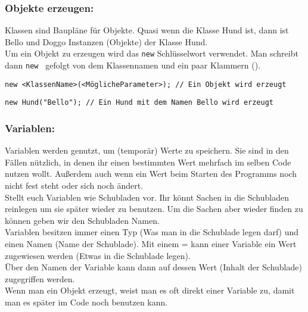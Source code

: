 \begin{Infobox}

	\subsubsection*{Objekte erzeugen:}
	Klassen sind Baupläne für Objekte. Quasi wenn die Klasse Hund ist, dann ist Bello und Doggo Instanzen (Objekte) der Klasse Hund.\\
	Um ein Objekt zu erzeugen wird das \lstinline{new} Schlüsselwort verwendet.
	Man schreibt dann \lstinline{new } gefolgt von dem Klassennamen und ein paar Klammern ().
\end{Infobox}
\begin{lstlisting}[title=\textbf{Objekt erstellen Syntax}]
	new <KlassenName>(<MöglicheParameter>); // Ein Objekt wird erzeugt
\end{lstlisting}

\begin{lstlisting}[title=\textbf{Objekt erstellen Beispiel}]
	new Hund("Bello"); // Ein Hund mit dem Namen Bello wird erzeugt
\end{lstlisting}
\begin{Infobox}
	\subsubsection*{Variablen:}
	Variablen werden genutzt, um (temporär) Werte zu speichern.
	Sie sind in den Fällen nützlich, in denen ihr einen bestimmten Wert mehrfach im selben Code nutzen wollt.
	Außerdem auch wenn ein Wert beim Starten des Programms noch nicht fest steht oder sich noch ändert.\\

	Stellt euch Variablen wie Schubladen vor. Ihr könnt Sachen in die Schubladen reinlegen um sie später wieder zu benutzen. Um die Sachen aber wieder finden zu können geben wir den Schubladen Namen.\\

	Variablen besitzen immer einen Typ (Was man in die Schublade legen darf) und einen Namen (Name der Schublade).
	Mit einem = kann einer Variable ein Wert zugewiesen werden (Etwas in die Schublade legen).\\
	Über den Namen der Variable kann dann auf dessen Wert (Inhalt der Schublade) zugegriffen werden.\\

	Wenn man ein Objekt erzeugt, weist man es oft direkt einer Variable zu, damit man es später im Code noch benutzen kann.
\end{Infobox}

